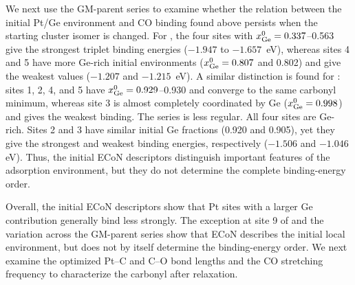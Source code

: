 We next use the GM-parent series to examine whether the relation between the
initial Pt/Ge environment and CO binding found above persists when the starting
cluster isomer is changed. For , the four sites with
$x_{\rm Ge}^{0}=0.337$--0.563 give the strongest triplet binding energies
($-1.947$ to $-1.657$~eV), whereas sites 4 and 5 have more Ge-rich initial
environments ($x_{\rm Ge}^{0}=0.807$ and 0.802) and give the weakest values
($-1.207$ and $-1.215$~eV). A similar distinction is found for :
sites 1, 2, 4, and 5
have $x_{\rm Ge}^{0}=0.929$--0.930 and converge to the same carbonyl minimum,
whereas site 3 is almost completely coordinated by Ge
($x_{\rm Ge}^{0}=0.998$) and gives the weakest binding. The 
series is less regular. All four sites are Ge-rich. Sites 2 and 3 have similar
initial Ge fractions (0.920 and 0.905), yet they give the strongest and weakest
binding energies, respectively ($-1.506$ and $-1.046$ eV). {Thus, the
initial ECoN descriptors distinguish important features of the adsorption
environment, but they do not determine the complete binding-energy order.}

{Overall, the initial ECoN descriptors show that Pt sites with a larger
Ge contribution generally bind  less strongly.}
{The exception at site 9 of  and the variation across the
GM-parent  series show that ECoN describes the initial local
environment, but does not by itself determine the binding-energy order. We next examine the optimized Pt–C and C–O bond lengths and the CO stretching frequency to characterize the carbonyl after relaxation.}

